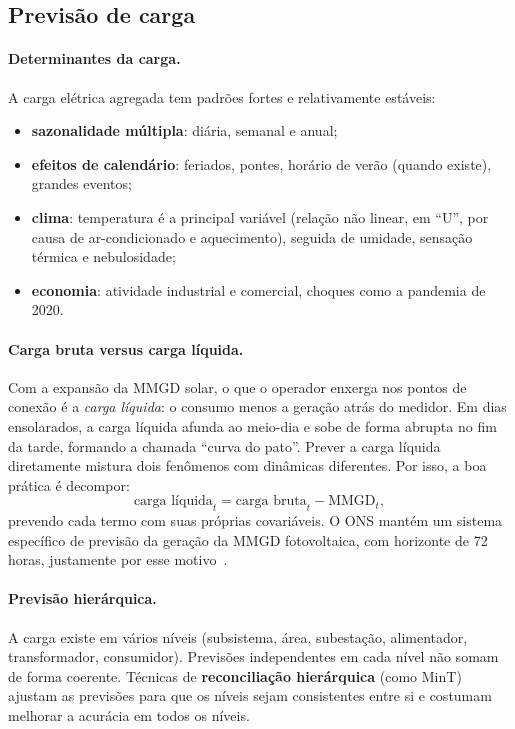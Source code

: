 \documentclass[10pt,a4paper,oneside]{article}
\begin{document}
\subsection{Previsão de carga}

\paragraph{Determinantes da carga.} A carga elétrica agregada tem padrões
fortes e relativamente estáveis:
\begin{itemize}
  \item \textbf{sazonalidade múltipla}: diária, semanal e anual;
  \item \textbf{efeitos de calendário}: feriados, pontes, horário de verão
    (quando existe), grandes eventos;
  \item \textbf{clima}: temperatura é a principal variável (relação não
    linear, em ``U'', por causa de ar-condicionado e aquecimento), seguida de
    umidade, sensação térmica e nebulosidade;
  \item \textbf{economia}: atividade industrial e comercial, choques como a
    pandemia de 2020.
\end{itemize}

\paragraph{Carga bruta versus carga líquida.} Com a expansão da MMGD solar, o
que o operador enxerga nos pontos de conexão é a \emph{carga líquida}: o
consumo menos a geração atrás do medidor. Em dias ensolarados, a carga
líquida afunda ao meio-dia e sobe de forma abrupta no fim da tarde, formando
a chamada ``curva do pato''. Prever a carga líquida diretamente mistura dois
fenômenos com dinâmicas diferentes. Por isso, a boa prática é decompor:
\begin{equation}
  \text{carga líquida}_t = \text{carga bruta}_t - \text{MMGD}_t,
\end{equation}
prevendo cada termo com suas próprias covariáveis. O ONS mantém um sistema
específico de previsão da geração da MMGD fotovoltaica, com horizonte de
72 horas, justamente por esse motivo~\cite{onssolar}.

\paragraph{Previsão hierárquica.} A carga existe em vários níveis
(subsistema, área, subestação, alimentador, transformador, consumidor).
Previsões independentes em cada nível não somam de forma coerente. Técnicas de
\textbf{reconciliação hierárquica} (como MinT) ajustam as previsões para que
os níveis sejam consistentes entre si e costumam melhorar a acurácia em todos
os níveis.
\end{document}
